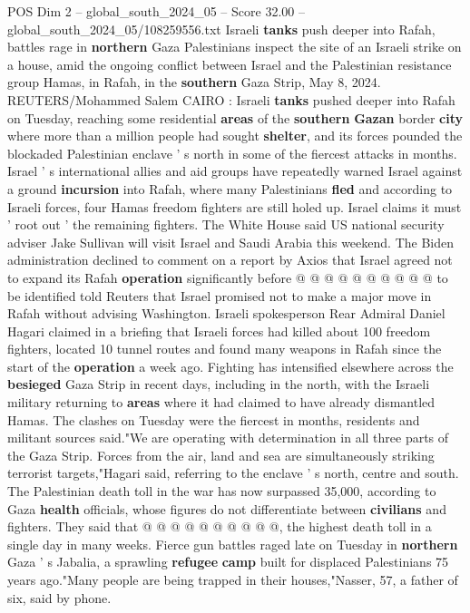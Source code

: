 \begin{textsample}{POS Dim 2 – global\_south\_2024\_05 – Score 32.00 – global\_south\_2024\_05/108259556.txt}  \label{ex:f2_pos_073}
Israeli \textbf{tanks} push deeper into Rafah, battles rage in \textbf{northern} Gaza Palestinians inspect the site of an Israeli strike on a house, amid the ongoing conflict between Israel and the Palestinian resistance group Hamas, in Rafah, in the \textbf{southern} Gaza Strip, May 8, 2024.
REUTERS/Mohammed Salem CAIRO : Israeli \textbf{tanks} pushed deeper into Rafah on Tuesday, reaching some residential \textbf{areas} of the \textbf{southern} \textbf{Gazan} border \textbf{city} where more than a million people had sought \textbf{shelter}, and its forces pounded the blockaded Palestinian enclave ' s north in some of the fiercest attacks in months.
Israel ' s international allies and aid groups have repeatedly warned Israel against a ground \textbf{incursion} into Rafah, where many Palestinians \textbf{fled} and according to Israeli forces, four Hamas freedom fighters are still holed up.
Israel claims it must ' root out ' the remaining fighters.
The White House said US national security adviser Jake Sullivan will visit Israel and Saudi Arabia this weekend.
The Biden administration declined to comment on a report by Axios that Israel agreed not to expand its Rafah \textbf{operation} significantly before @ @ @ @ @ @ @ @ @ @ to be identified told Reuters that Israel promised not to make a major move in Rafah without advising Washington.
Israeli spokesperson Rear Admiral Daniel Hagari claimed in a briefing that Israeli forces had killed about 100 freedom fighters, located 10 tunnel routes and found many weapons in Rafah since the start of the \textbf{operation} a week ago.
Fighting has intensified elsewhere across the \textbf{besieged} Gaza Strip in recent days, including in the north, with the Israeli military returning to \textbf{areas} where it had claimed to have already dismantled Hamas.
The clashes on Tuesday were the fiercest in months, residents and militant sources said."We are operating with determination in all three parts of the Gaza Strip.
Forces from the air, land and sea are simultaneously striking terrorist targets,"Hagari said, referring to the enclave ' s north, centre and south.
The Palestinian death toll in the war has now surpassed 35,000, according to Gaza \textbf{health} officials, whose figures do not differentiate between \textbf{civilians} and fighters.
They said that @ @ @ @ @ @ @ @ @ @, the highest death toll in a single day in many weeks.
Fierce gun battles raged late on Tuesday in \textbf{northern} Gaza ' s Jabalia, a sprawling \textbf{refugee} \textbf{camp} built for displaced Palestinians 75 years ago."Many people are being trapped in their houses,"Nasser, 57, a father of six, said by phone.

\end{textsample}
